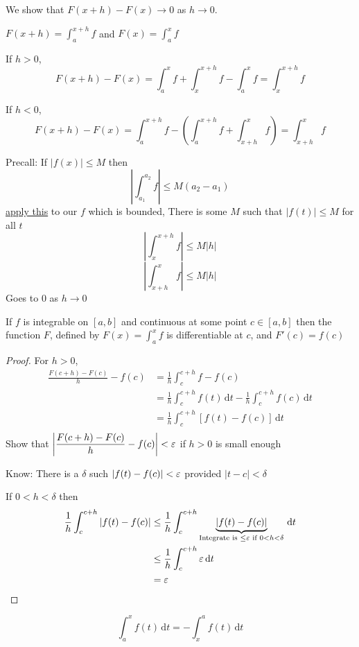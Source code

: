 We show that $F(x+h) - F(x) \to 0$ as $h \to 0$.

$\displaystyle F(x+h) = \int_a^{x+h} f$ and 
$\displaystyle F(x) = \int_a^{x} f$

If $h > 0$, $$\displaystyle F(x+h) - F(x) = \int_a^x f + \int_x^{x+h} f - \int_a^x f = \int_x^{x+h} f$$

If $h < 0$, $$\displaystyle F(x+h) - F(x) = \int_a^{x+h} f -\left( \int_a^{x+h} f + \int_{x+h}^x f\right) = \int_{x+h}^{x} f$$

Precall: If $|f(x)| \le M$ then 
\[\left|\int_{a_1}^{a_2} f\right| \le M(a_2 - a_1)\]
\underline{apply this} to our $f$ which is bounded, There is some  $M$ such that $|f(t)| \le M$ for all $t$
\[\left|\int_{x}^{x+h} f\right| \le M|h|\]
\[\left|\int_{x+h}^{x} f\right| \le M|h|\]
Goes to $0$ as $h \to 0$

\begin{theorem*}
  If $f$ is integrable on $[a, b]$ and continuous at some point $c \in [a, b]$ then the function
  $F$, defined by $\displaystyle F(x) = \int_a^x f$ is differentiable at $c$, and $F'(c) = f(c)$ 
\end{theorem*}

\begin{proof}
  For $h > 0$,
  \begin{align*}
    \frac{F(c+h)-F(c)}{h} - f(c) &= \frac{1}{h}\int_c^{c+h} f - f(c) \\
    &= \frac{1}{h} \int_c^{c+h} f(t) \,\mathrm{d}t - \frac{1}{h}\int_c^{c+h} f(c)\,\mathrm{d}t \\
    &= \frac{1}{h} \int_c^{c+h}[f(t) - f(c)]\,\mathrm{d}t \\
  \end{align*}
  Show that $\displaystyle \left|\frac{F(c+h) - F(c)}{h} - f(c)\right| < \varepsilon$ if $h>0$ is small enough

  Know: There is a $\delta$ such $|f(t) - f(c)| < \varepsilon$ provided $|t-c| < \delta$

  If $0  < h < \delta$ then 
  \begin{align*}
    \frac{1}{h} \int_c^{c+h} |f(t) - f(c)| &\le\frac{1}{h} \int_c^{c+h} \underbrace{|f(t)-f(c)|}_{\text{Integrate is } \le \varepsilon \text{ if } 0 < h < \delta}\,\mathrm{d}t \\ 
    &\le \frac{1}{h} \int_c^{c+h} \varepsilon \,\mathrm{d}t \\
    &= \varepsilon
  \end{align*}
\end{proof}
\[\int_a^x f(t)\,\mathrm{d}t = -\int_x^a f(t)\,\mathrm{d}t\]

